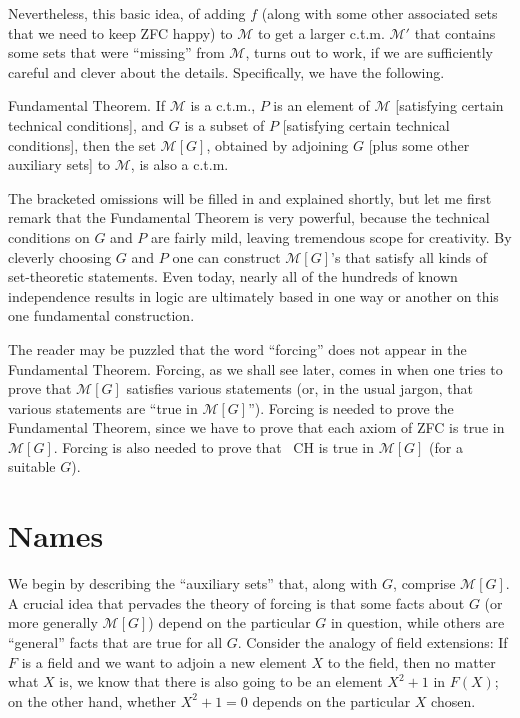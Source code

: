 \documentclass[10pt]{article}
\newcommand\axiom[1]{\textmd{#1}}
\theoremstyle{definition}
\theoremstyle{remark}
\begin{document}
Nevertheless, this basic idea, of adding $f$ (along with some other associated sets that we need to keep \axiom{ZFC} happy) to $\mathcal M$ to get a larger c.t.m. $\mathcal{M'}$ that contains some sets that were ``missing'' from $\mathcal M$, turns out to work, if we are sufficiently careful and clever about the details. Specifically, we have the following.

Fundamental Theorem. If $\mathcal M$ is a c.t.m., $P$ is an element of $\mathcal M$ [satisfying certain technical conditions], and $G$ is a subset of $P$ [satisfying certain technical conditions], then the set $\mathcal M[G]$, obtained by adjoining $G$ [plus some other auxiliary sets] to $\mathcal M$, is also a c.t.m.

The bracketed omissions will be filled in and explained shortly, but let me first remark that the Fundamental Theorem is very powerful, because the technical conditions on $G$ and $P$ are fairly mild, leaving tremendous scope for creativity. By cleverly choosing $G$ and $P$ one can construct $\mathcal M[G]$'s that satisfy all kinds of set-theoretic statements. Even today, nearly all of the hundreds of known independence results in logic are ultimately based in one way or another on this one fundamental construction.

The reader may be puzzled that the word ``forcing'' does not appear in the Fundamental Theorem. Forcing, as we shall see later, comes in when one tries to prove that $\mathcal M[G]$ satisfies various statements (or, in the usual jargon, that various statements are ``true in $\mathcal M[G]$''). Forcing is needed to prove the Fundamental Theorem, since we have to prove that each axiom of \axiom{ZFC} is true in $\mathcal M[G]$. Forcing is also needed to prove that \axiom{~CH} is true in $\mathcal M[G]$ (for a suitable $G$).


\section{Names}

We begin by describing the ``auxiliary sets'' that, along with $G$, comprise $\mathcal M[G]$. A crucial idea that pervades the theory of forcing is that some facts about $G$ (or more generally $\mathcal M[G]$) depend on the particular $G$ in question, while others are ``general'' facts that are true for all $G$. Consider the analogy of field extensions: If $F$ is a field and we want to adjoin a new element $X$ to the field, then no matter what $X$ is, we know that there is also going to be an element $X^2 + 1$ in $F(X)$; on the other hand, whether $X^2 + 1 = 0$ depends on the particular $X$ chosen.
\end{document}
